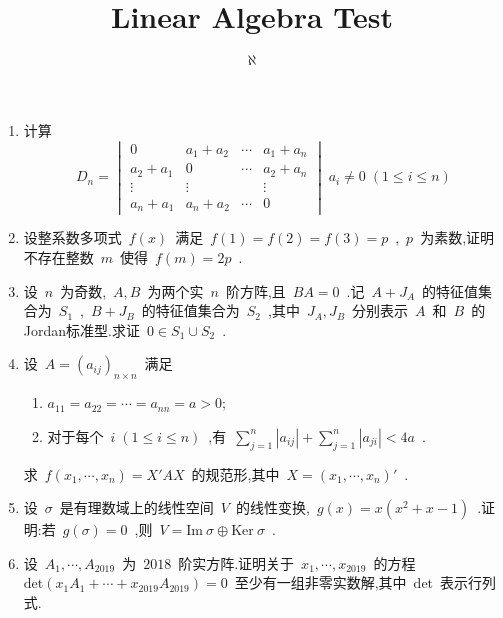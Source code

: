 \documentclass[UTF8]{article}
\title{Linear Algebra Test}
\author{$\aleph$}
\begin{document}
    \maketitle
    \begin{enumerate}
        \item 计算
        $$
        D_n=
        \begin{vmatrix}
        0&a_1+a_2&\cdots&a_1+a_n\\
        a_2+a_1&0&\cdots&a_2+a_n\\
        \vdots&\vdots&&\vdots\\
        a_n+a_1&a_n+a_2&\cdots&0
        \end{vmatrix}
        \;a_i\neq0\;(1\leq i\leq n)
        $$
        \item 设整系数多项式~$f(x)$~满足~$f(1)=f(2)=f(3)=p$~,~$p$~为素数,证明不存在整数~$m$~使得~$f(m)=2p$~.
        \item 设~$n$~为奇数,~$A,B$~为两个实~$n$~阶方阵,且~$BA=0$~.记~$A+J_A$~的特征值集合为~$S_1$~,~$B+J_B$~的特征值集合为~$S_2$~,其中~$J_A,J_B$~分别表示~$A$~和~$B$~的Jordan标准型.求证~$0\in S_1\cup S_2$~.
        \item 设~$A=(a_{ij})_{n\times n}$~满足
        \begin{enumerate}
            \item $a_{11}=a_{22}=\cdots=a_{nn}=a>0;$~
            \item 对于每个~$i\;(1\leq i\leq n)$~,有~$\sum_{j=1}^{n}|a_{ij}|+\sum_{j=1}^{n}|a_{ji}|<4a$~.
        \end{enumerate}
        求~$f(x_1,\cdots,x_n)=X'AX$~的规范形,其中~$X=(x_1,\cdots,x_n)'$~.
        \item 设~$\sigma$~是有理数域上的线性空间~$V$~的线性变换,~$g(x)=x(x^2+x-1)$~.证明:若~$g(\sigma)=0$~,则~$V=\mathrm{Im}\ \sigma\oplus \mathrm{Ker}\ \sigma$~.
        \item 设~$A_1,\cdots,A_{2019}$~为~$2018$~阶实方阵.证明关于~$x_1,\cdots,x_{2019}$~的方程~$\mathrm{det}(x_1A_1+\cdots+x_{2019}A_{2019})=0$~至少有一组非零实数解,其中~$\mathrm{det}$~表示行列式.
    \end{enumerate}
\end{document}
